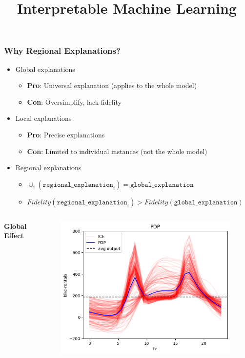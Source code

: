 \documentclass[11pt,compress,t,notes=noshow, aspectratio=169, xcolor=table,dvipsnames]{beamer}
\title{Interpretable Machine Learning}
\date{}
\begin{document}
\newcommand{\titlefigure}{figure/ale_plot.pdf}
\newcommand{\learninggoals}{
\item Difference between feature effects and feature interactions
\item REPID
\item GADGET
}



\begin{frame}
  \frametitle{Why Regional Explanations?}
  \begin{itemize}
    \item Global explanations
    \begin{itemize}
      \item \textbf{Pro}: Universal explanation (applies to the whole model)
      \item \textbf{Con}: Oversimplify, lack fidelity
    \end{itemize}
    \item Local explanations
    \begin{itemize}
      \item \textbf{Pro}: Precise explanations
      \item \textbf{Con}: Limited to individual instances (not the whole model)
    \end{itemize}
    \item Regional explanations
    \begin{itemize}
      \item $\cup_i (\texttt{regional\_explanation}_i) = \texttt{global\_explanation} $
      \item $Fidelity (\texttt{regional\_explanation}_i ) > Fidelity(\texttt{global\_explanation} ) $
      \end{itemize}
  \end{itemize}
  \noindent\makebox[\linewidth]{\rule{\paperwidth}{0.4pt}}
  \begin{columns}
      \centering
      \textbf{Global Effect}
      \begin{figure}
          \centering
          \includegraphics[width=.9\linewidth]{slides/03_feature-effects/figure/01_bike_sharing_dataset_18_1.png}
      \end{figure}


\end{columns}
\end{frame}
\end{document}
